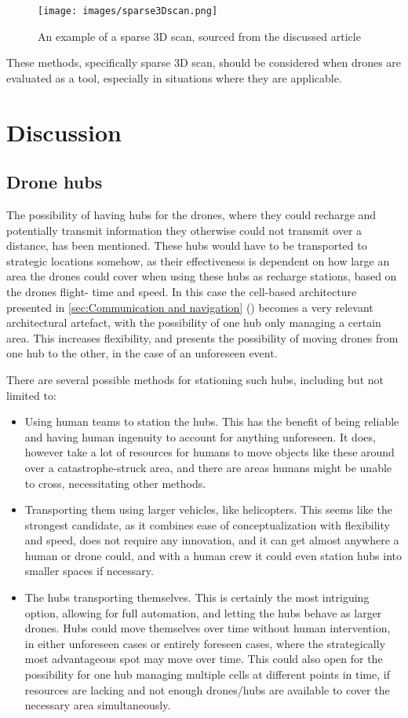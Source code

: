 \documentclass[fleqn,10pt]{wlscirep}
\newcommand{\citesup}[1]{\textsuperscript{\cite{#1}}}
\newcommand{\cnref}[1]{\cref{#1} (\nameref{#1})}
\begin{document}
\begin{figure}[h]
\centering
\texttt{[image: images/sparse3Dscan.png]}
\caption{An example of a sparse 3D scan, sourced from the discussed article\citesup{Natural_Disasters}}
\label{fig:sparse3Dscan}
\end{figure}

These methods, specifically sparse 3D scan, should be considered when drones are evaluated as a tool, especially in situations where they are applicable.


\section{Discussion}
\subsection{Drone hubs} \label{sec:drone hubs discussion}
The possibility of having hubs for the drones, where they could recharge and potentially transmit information they otherwise could not transmit over a distance, has been mentioned. These hubs would have to be transported to strategic locations somehow, as their effectiveness is dependent on how large an area the drones could cover when using these hubs as recharge stations, based on the drones flight- time and speed. In this case the cell-based architecture presented in \cnref{sec:Communication and navigation} becomes a very relevant architectural artefact, with the possibility of one hub only managing a certain area. This increases flexibility, and presents the possibility of moving drones from one hub to the other, in the case of an unforeseen event.

There are several possible methods for stationing such hubs, including but not limited to:
\begin{itemize}
  \item Using human teams to station the hubs. This has the benefit of being reliable and having human ingenuity to account for anything unforeseen. It does, however take a lot of resources for humans to move objects like these around over a catastrophe-struck area, and there are areas humans might be unable to cross, necessitating other methods.
  \item Transporting them using larger vehicles, like helicopters. This seems like the strongest candidate, as it combines ease of conceptualization with flexibility and speed, does not require any innovation, and it can get almost anywhere a human or drone could, and with a human crew it could even station hubs into smaller spaces if necessary.
  \item The hubs transporting themselves. This is certainly the most intriguing option, allowing for full automation, and letting the hubs behave as larger drones. Hubs could move themselves over time without human intervention, in either unforeseen cases or entirely foreseen cases, where the strategically most advantageous spot may move over time. This could also open for the possibility for one hub managing multiple cells at different points in time, if resources are lacking and not enough drones/hubs are available to cover the necessary area simultaneously.
\end{itemize}
\end{document}
